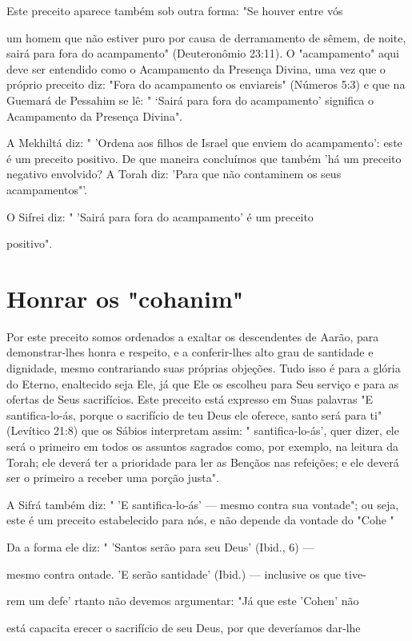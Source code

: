 \begin{itemize}
\begin{enumrate}
\begin{itemize}
\begin{itemize}
Este preceito aparece também sob outra forma: "Se houver entre vós

um homem que não estiver puro por causa de derramamento de sêmem, de
noite, sairá para fora do acampamento" (Deuteronômio 23:11). O
"acampamen­to" aqui deve ser entendido como o Acampamento da Presença
Divina, uma vez que o próprio preceito diz: "Fora do acampamento os
enviareis" (Núme­ros 5:3) e que na Guemará de Pessahim se lê: " `Sairá
para fora do acampamen­to' significa o Acampamento da Presença Divina".

A Mekhiltá diz: " 'Ordena aos filhos de Israel que enviem do
acam­pamento': este é um preceito positivo. De que maneira concluímos
que tam­bém 'há um preceito negativo envolvido? A Torah diz: 'Para que
não contami­nem os seus acampamentos"'.


O Sifrei diz: " 'Sairá para fora do acampamento' é um preceito


positivo".

\section{Honrar os "cohanim"}

Por este preceito somos ordenados a exaltar os descendentes de Aa­rão,
para demonstrar-lhes honra e respeito, e a conferir-lhes alto grau de
santi­dade e dignidade, mesmo contrariando suas próprias objeções. Tudo
isso é pa­ra a glória do Eterno, enaltecido seja Ele, já que Ele os
escolheu para Seu servi­ço e para as ofertas de Seus sacrifícios. Este
preceito está expresso em Suas pa­lavras "E santifica-lo-ás, porque o
sacrifício de teu Deus ele oferece, santo será para ti" (Levítico 21:8)
que os Sábios interpretam assim: " santifica-lo-ás', quer dizer, ele
será o primeiro em todos os assuntos sagrados como, por exemplo, na
leitura da Torah; ele deverá ter a prioridade para ler as Bençãos nas
refei­ções; e ele deverá ser o primeiro a receber uma porção justa".

A Sifrá também diz: " 'E santifica-lo-ás' --- mesmo contra sua
vonta­de"; ou seja, este é um preceito estabelecido para nós, e não
depende da von­tade do "Cohe "

Da a forma ele diz: " 'Santos serão para seu Deus' (Ibid., 6) ---

mesmo contra ontade. 'E serão santidade' (Ibid.) --- inclusive os que
tive-

rem um defe' rtanto não devemos argumentar: "Já que este 'Cohen' não

está capacita erecer o sacrifício de seu Deus, por que deveríamos
dar-lhe


\end{itemize}
\end{itemize}
\end{enumrate}
\end{itemize}
